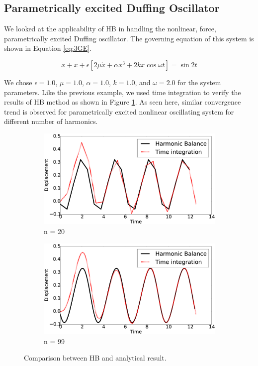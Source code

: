 \documentclass[12pt, a4paper]{extarticle}
\begin{document}
\subsection{Parametrically excited Duffing Oscillator}
We looked at the applicability of HB in handling the nonlinear, force, parametrically excited Duffing oscillator. The governing equation of this system is shown in Equation \eqref{eq:3GE}.

\begin{equation}\label{eq:3GE}
	\ddot{x} + x + \epsilon \left[ 2 \mu \dot{x} + \alpha x^3 + 2 k x \cos \omega t \right] = \sin 2t	
\end{equation}

We chose $\epsilon = 1.0$, $\mu = 1.0$, $\alpha = 1.0$, $k = 1.0$, and $\omega = 2.0$ for the system parameters. Like the previous example, we used time integration to verify the results of HB method as shown in Figure \ref{fig:R3}. As seen here, similar convergence trend is observed for parametrically excited nonlinear oscillating system for different number of harmonics.

\begin{figure}[H]
	\centering
	\begin{subfigure}[h]{8.0 cm}
		\includegraphics[width=8.0 cm]{figure/3N20.eps}
		\caption{n = 20}
	\end{subfigure}
	\begin{subfigure}[h]{8.0 cm}
        \includegraphics[width=8.0 cm]{figure/3N99.eps}
		\caption{n = 99}
    \end{subfigure}
    \caption{Comparison between HB and analytical result.}
    \label{fig:R3}
\end{figure}
\end{document}
